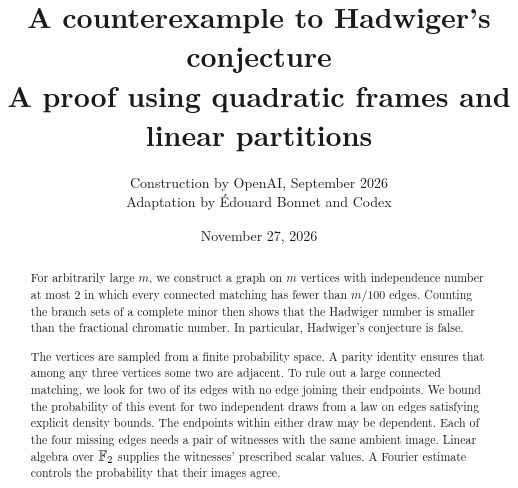 \documentclass[11pt]{article}
\title{A counterexample to Hadwiger's conjecture\\[.2em]
\large A proof using quadratic frames and linear partitions}
\author{Construction by OpenAI, September 2026\\
Adaptation by \'{E}douard Bonnet and Codex}
\date{November 27, 2026}
\begin{document}
\maketitle
\begin{abstract}
For arbitrarily large \(m\), we construct a graph on \(m\) vertices
with independence number at most 2 in which every connected matching has
fewer than \(m/100\) edges. Counting the branch sets of a complete minor
then shows that the Hadwiger number is smaller than the fractional
chromatic number. In particular, Hadwiger's conjecture is false.

The vertices are sampled from a finite probability space. A parity
identity ensures that among any three vertices some two are adjacent.
To rule out a large connected matching, we look for
two of its edges with no edge joining their endpoints. We bound the
probability of this event for two independent draws from a law on
edges satisfying explicit density bounds. The endpoints within either
draw may be dependent. Each of the four missing edges needs a pair of
witnesses with the same ambient image. Linear algebra over \(\mathbb F_2\)
supplies the witnesses' prescribed scalar values. A Fourier estimate
controls the probability that their images agree.

\end{abstract}
\begingroup
\small
\setlength{\parskip}{0pt}
\setcounter{tocdepth}{1}
\tableofcontents
\endgroup
\clearpage














\appendix

\setlength{\bibsep}{3pt plus 1pt minus 1pt}


\end{document}

